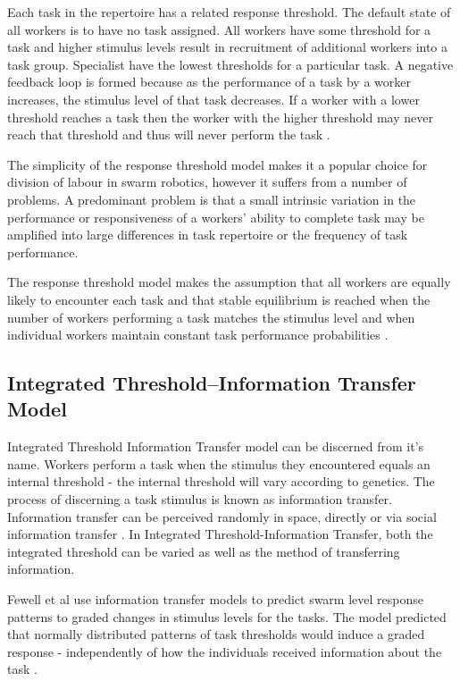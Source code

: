 Each task in the repertoire has a related response threshold. The default state of all workers is to have no task assigned. All workers have some threshold for a task and higher stimulus levels result in recruitment of additional workers into a task group. Specialist have the lowest thresholds for a particular task. A negative feedback loop is formed because as the performance of a task by a worker increases, the stimulus level of that task decreases. If a worker with a lower threshold reaches a task then the worker with the higher threshold may never reach that threshold and thus will never perform the task \cite{beshers2001models}.

The simplicity of the response threshold model makes it a popular choice for division of labour in swarm robotics, however it suffers from a number of problems. A predominant problem is that a small intrinsic variation in the performance or responsiveness of a workers' ability to complete task may be amplified into large differences in task repertoire or the frequency of task performance. 

The response threshold model makes the assumption that all workers are equally likely to encounter each task and that stable equilibrium is reached when the number of workers performing a task matches the stimulus level and when individual workers maintain constant task performance probabilities \cite{page1990self}.

\subsection{Integrated Threshold--Information Transfer Model}
\label{integratedthreshold}

Integrated Threshold Information Transfer model can be discerned from it's name. Workers perform a task when the stimulus they encountered equals an internal threshold - the internal threshold will vary according to genetics. The process of discerning a task stimulus is known as information transfer. Information transfer can be perceived randomly in space, directly or via social information transfer  \cite{fewell1999division}. In Integrated Threshold-Information Transfer, both the integrated threshold can be varied as well as the method of transferring information.

Fewell et al  use information transfer models to predict swarm level response patterns to graded changes in stimulus levels for the tasks. The model predicted that normally distributed patterns of task thresholds would induce a graded response - independently of how the individuals received information about the task \cite{fewell1999division}.

